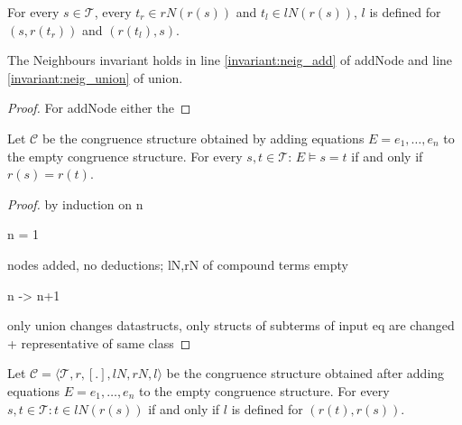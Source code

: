 \begin{invariant}[Neighbours]

For every $s \in \mathcal{T}$, every $t_r \in rN(r(s))$ and $t_l \in lN(r(s))$, $l$ is defined for $(s,r(t_r))$ and $(r(t_l),s)$.

\end{invariant}

\begin{proposition}

The Neighbours invariant holds in line \ref{invariant:neig_add} of addNode and line \ref{invariant:neig_union} of union.

\end{proposition}

\begin{proof}

For addNode either the 

\end{proof}

\begin{proposition}[Correctness]

Let $\mathcal{C}$ be the congruence structure obtained by adding equations $E = e_1, \ldots, e_n$ to the empty congruence structure.
For every $s,t \in \mathcal{T}$: $E \models s = t$ if and only if $r(s) = r(t)$.

\end{proposition}

\begin{proof}

by induction on n

n = 1

nodes added, no deductions; lN,rN of compound terms empty 

n -> n+1

only union changes datastructs,
only structs of subterms of input eq are changed + representative of same class

\end{proof}

\begin{proposition}

Let $\mathcal{C} = \langle \mathcal{T},r,[.], lN, rN, l \rangle$ be the congruence structure obtained after adding equations $E = e_1, \ldots, e_n$ to the empty congruence structure.
For every $s,t \in \mathcal{T}: t \in lN(r(s))$ if and only if $l$ is defined for $(r(t),r(s))$.

\end{proposition}

